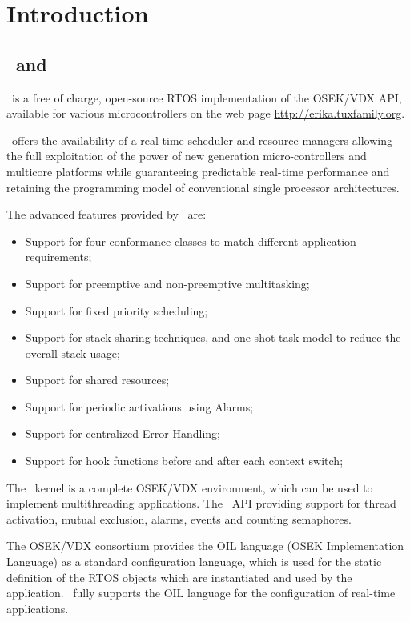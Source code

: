 \chapter{Introduction}

\section{\ee\ and \rtd}

\ee\ is a free of charge, open-source RTOS implementation of the
OSEK/VDX API, available for various microcontrollers on the web page
\url{http://erika.tuxfamily.org}.

\ee\ offers the availability of a real-time scheduler and resource 
managers allowing the full exploitation of the power of new generation 
micro-controllers and multicore platforms while guaranteeing predictable 
real-time performance and retaining the programming model of 
conventional single processor architectures.

The advanced features provided by \ee\ are:

\begin{itemize}
\item Support for four conformance classes to match different
application requirements;
\item Support for preemptive and non-preemptive multitasking;
\item Support for fixed priority scheduling;
\item Support for stack sharing techniques, and one-shot task
model to reduce the overall stack usage;
\item Support for shared resources;
\item Support for periodic activations using Alarms;
\item Support for centralized Error Handling;
\item Support for hook functions before and after each context
switch;
\end{itemize}

The \ee\ kernel is a complete OSEK/VDX environment, which can be used
to implement multithreading applications. The \ee\ API providing
support for thread activation, mutual exclusion, alarms, events and
counting semaphores.

The OSEK/VDX consortium provides the OIL language (OSEK Implementation
Language) as a standard configuration language, which is used for the
static definition of the RTOS objects which are instantiated and used
by the application. \ee\ fully supports the OIL language for the
configuration of real-time applications.


